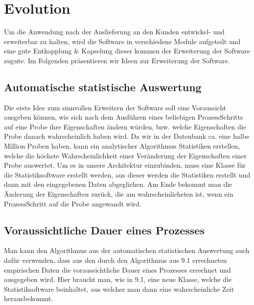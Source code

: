 \documentclass[enabledeprecatedfontcommands,fontsize=12pt,paper=a4,twoside]{scrartcl}
\begin{document}
{%

\section{Evolution}

\label{sec:evolution}
Um die Anwendung nach der Auslieferung an den Kunden entwickel- und erweiterbar zu halten, wird die Software in verschiedene Module aufgeteilt und eine gute Entkopplung \& Kapselung dieser kommen der Erweiterung der Software zugute. Im Folgenden präsentieren wir Ideen zur Erweiterung der Software.

\subsection{Automatische statistische Auswertung} 
{ Die erste Idee zum
  sinnvollen Erweitern der Software soll eine Voraussicht ausgeben können, wie
  sich nach dem Ausführen eines beliebigen ProzessSchritts auf eine Probe ihre
  Eigenschaften ändern würden, bzw. welche Eigenschaften die Probe danach
  wahrscheinlich haben wird. Da wir in der Datenbank ca. eine halbe Million
  Proben haben, kann ein analytischer Algorithmus Statistiken erstellen, welche
  die höchste Wahrscheinlichkeit einer Veränderung der Eigenschaften einer Probe
  auswertet. Um es in unsere Architektur einzubinden, muss eine Klasse für die
  Statistiksoftware erstellt werden, aus dieser werden die Statistiken erstellt
  und dann mit den eingegebenen Daten abgeglichen. Am Ende bekommt man die
  Änderung der Eigenschaften zurück, die am wahrscheinlichsten ist, wenn ein ProzessSchritt auf die Probe angewandt wird.
}
\subsection{Voraussichtliche Dauer eines Prozesses} 
{ Man kann den Algorithmus aus der automatischen statistischen Auswertung auch dafür verwenden, dass aus den durch den Algorithmus aus 9.1 errechneten empirischen Daten die voraussichtliche Dauer eines Prozesses errechnet und ausgegeben wird. Hier braucht man, wie in 9.1, eine neue Klasse, welche die Statistiksoftware beinhaltet, aus welcher man dann eine wahrscheinliche Zeit herausbekommt.
}
}
\end{document}
